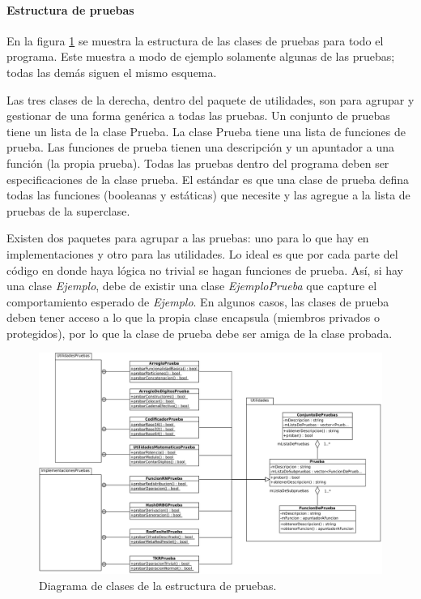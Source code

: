 %
%
%

\paragraph{Estructura de pruebas}

En la figura \ref{clases_pruebas} se muestra la estructura de las clases de
pruebas para todo el programa. Este muestra a modo de ejemplo solamente algunas
de las pruebas; todas las demás siguen el mismo esquema.

Las tres clases de la derecha, dentro del paquete de utilidades, son para
agrupar y gestionar de una forma genérica a todas las pruebas. Un conjunto de
pruebas tiene un lista de la clase Prueba. La clase Prueba tiene una lista de
funciones de prueba. Las funciones de prueba tienen una descripción y un
apuntador a una función (la propia prueba). Todas las pruebas dentro del
programa deben ser especificaciones de la clase prueba. El estándar es que una
clase de prueba defina todas las funciones (booleanas y estáticas) que necesite
y las agregue a la lista de pruebas de la superclase.

Existen dos paquetes para agrupar a las pruebas: uno para lo que hay en
implementaciones y otro para las utilidades. Lo ideal es que por cada parte del
código en donde haya lógica no trivial se hagan funciones de prueba. Así, si hay
una clase \textit{Ejemplo}, debe de existir una clase \textit{EjemploPrueba}
que capture el comportamiento esperado de \textit{Ejemplo}. En algunos casos,
las clases de prueba deben tener acceso a lo que la propia clase encapsula
(miembros privados o protegidos), por lo que la clase de prueba debe ser amiga
de la clase probada.

\begin{figure}
  \begin{center}
    \includegraphics[width=1.0\linewidth]{diagramas/pruebas.png}
    \caption{Diagrama de clases de la estructura de pruebas.}
    \label{clases_pruebas}
  \end{center}
\end{figure}
